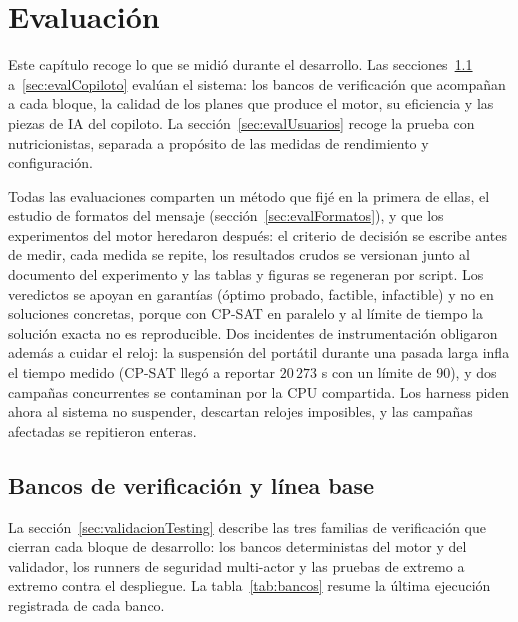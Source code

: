 \chapter{Evaluación}
\label{cap:evaluacion}

Este capítulo recoge lo que se midió durante el desarrollo. Las secciones~\ref{sec:evalBancos} a~\ref{sec:evalCopiloto} evalúan el sistema: los bancos de verificación que acompañan a cada bloque, la calidad de los planes que produce el motor, su eficiencia y las piezas de IA del copiloto. La sección~\ref{sec:evalUsuarios} recoge la prueba con nutricionistas, separada a propósito de las medidas de rendimiento y configuración.

Todas las evaluaciones comparten un método que fijé en la primera de ellas, el estudio de formatos del mensaje (sección~\ref{sec:evalFormatos}), y que los experimentos del motor heredaron después: el criterio de decisión se escribe antes de medir, cada medida se repite, los resultados crudos se versionan junto al documento del experimento y las tablas y figuras se regeneran por script. Los veredictos se apoyan en garantías (óptimo probado, factible, infactible) y no en soluciones concretas, porque con CP-SAT en paralelo y al límite de tiempo la solución exacta no es reproducible. Dos incidentes de instrumentación obligaron además a cuidar el reloj: la suspensión del portátil durante una pasada larga infla el tiempo medido (CP-SAT llegó a reportar $20\,273$ s con un límite de 90), y dos campañas concurrentes se contaminan por la CPU compartida. Los harness piden ahora al sistema no suspender, descartan relojes imposibles, y las campañas afectadas se repitieron enteras.

\section{Bancos de verificación y línea base}
\label{sec:evalBancos}

La sección~\ref{sec:validacionTesting} describe las tres familias de verificación que cierran cada bloque de desarrollo: los bancos deterministas del motor y del validador, los runners de seguridad multi-actor y las pruebas de extremo a extremo contra el despliegue. La tabla~\ref{tab:bancos} resume la última ejecución registrada de cada banco.

